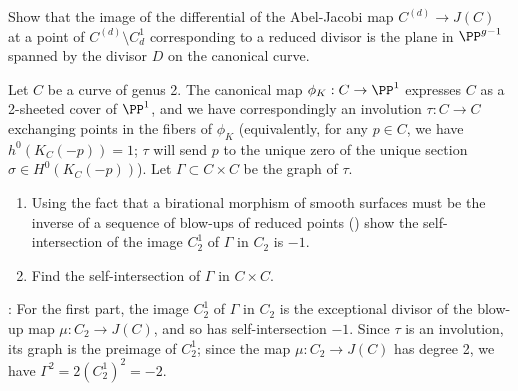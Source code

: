 \begin{exercise} \label{comparison with geometric RR}
Show that the image of the differential of the Abel-Jacobi map $C^{(d)} \to J(C)$ at a point of $C^{(d)} \setminus C^1_d$  corresponding to a reduced divisor is  the plane in $\PP^{g-1}$ spanned by the divisor $D$ on the canonical curve.
\end{exercise}

\begin{exercise}\label{blow-up of $J(C)$ at a point}
Let $C$ be a curve of genus 2. The canonical map $\phi_K : C \to \PP^1$ expresses $C$ as a 2-sheeted cover of $\PP^1$, and we have correspondingly an involution $\tau : C \to C$ exchanging points in the fibers of $\phi_K$ (equivalently, for any $p \in C$, we have $h^0(K_C(-p)) = 1$; $\tau$ will send $p$ to the unique zero of the unique section $\sigma \in H^0(K_C(-p))$). Let $\Gamma \subset C \times C$ be the graph of $\tau$.
\begin{enumerate}
\item Using the fact that a birational morphism of smooth surfaces must be the inverse of a sequence of blow-ups of reduced points (\cite[V.??]{H}) show the self-intersection of the image $C^1_2$ of $\Gamma$ in $C_2$ is $-1$.
\item Find the self-intersection of $\Gamma$ in $C \times C$.
\end{enumerate}

: For the first part, the image $C^1_2$  of $\Gamma$ in $C_2$ is the exceptional divisor of the blow-up map $\mu : C_2 \to J(C)$, and so has self-intersection $-1$. Since $\tau$ is an involution, its graph is the preimage of $C^1_2$; since the map $\mu : C_2 \to J(C)$ has degree 2, we have $\Gamma^2 = 2(C^1_2)^2 = -2$.
\end{exercise}

